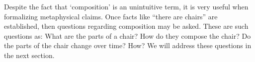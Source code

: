 \documentclass[11pt]{article}
\begin{document}
\begin{spacing}{1.25}
Despite the fact that `composition' is an unintuitive term, it is very
useful when formalizing metaphysical claims.  Once facts like ``there
are chairs'' are established, then questions regarding composition may
be asked.  These are such questions as: What are the parts of a chair?
How do they compose the chair?  Do the parts of the chair change over
time?  How?  We will address these questions in the next section.
\ifstandalone
\end{spacing}


\fi
\end{document}
